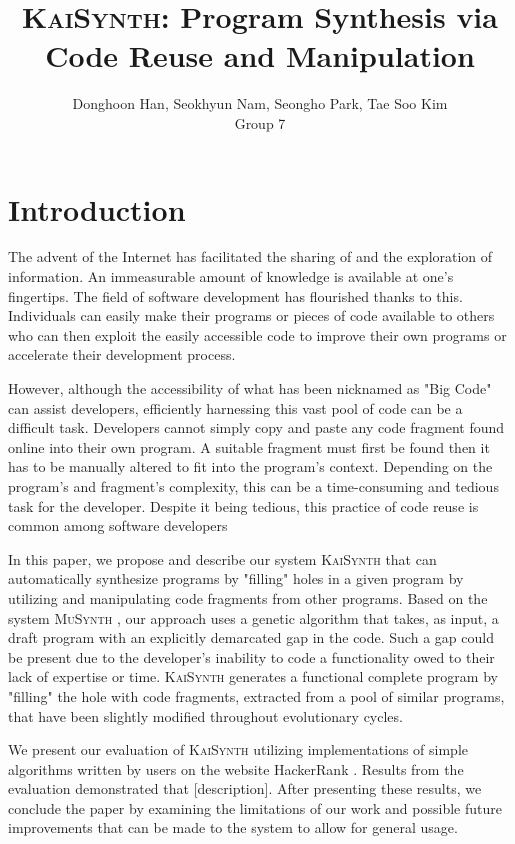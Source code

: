 \documentclass{article}
\title{\textsc{KaiSynth}: Program Synthesis via Code Reuse and Manipulation}
\author{Donghoon Han, Seokhyun Nam, Seongho Park, Tae Soo Kim\\Group 7}
\begin{document}
\maketitle

\section{Introduction}
The advent of the Internet has facilitated the sharing of and the exploration of information. An immeasurable amount of knowledge is available at one's fingertips. The field of software development has flourished thanks to this. Individuals can easily make their programs or pieces of code available to others who can then exploit the easily accessible code to improve their own programs or accelerate their development process.

However, although the accessibility of what has been nicknamed as "Big Code" can assist developers, efficiently harnessing this vast pool of code can be a difficult task. Developers cannot simply copy and paste any code fragment found online into their own program. A suitable fragment must first be found then it has to be manually altered to fit into the program's context. Depending on the program's and fragment's complexity, this can be a time-consuming and tedious task for the developer. Despite it being tedious, this practice of code reuse is common among software developers 

In this paper, we propose and describe our system \textsc{KaiSynth} that can automatically synthesize programs by "filling" holes in a given program by utilizing and manipulating code fragments from other programs. Based on the system \textsc{MuSynth} \cite{musynth}, our approach uses a genetic algorithm that takes, as input, a draft program with an explicitly demarcated gap in the code. Such a gap could be present due to the developer's inability to code a functionality owed to their lack of expertise or time. \textsc{KaiSynth} generates a functional complete program by "filling" the hole with code fragments, extracted from a pool of similar programs, that have been slightly modified throughout evolutionary cycles. 

We present our evaluation of \textsc{KaiSynth} utilizing implementations of simple algorithms written by users on the website HackerRank \cite{hackerrank}. Results from the evaluation demonstrated that [description]. After presenting these results, we conclude the paper by examining the limitations of our work and possible future improvements that can be made to the system to allow for general usage.
\end{document}

